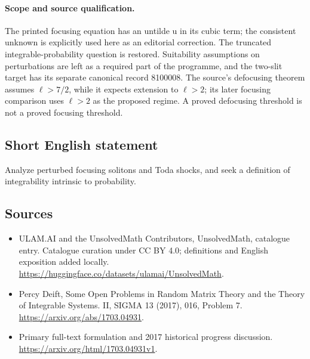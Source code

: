 \documentclass[11pt]{article}
\begin{document}
\paragraph{Scope and source qualification.}The printed focusing equation has an untilde u in its cubic term; the consistent unknown is explicitly used here as an editorial correction. The truncated integrable-probability question is restored. Suitability assumptions on perturbations are left as a required part of the programme, and the two-slit target has its separate canonical record 8100008. The source's defocusing theorem assumes $\ell>7/2$, while it expects extension to $\ell>2$; its later focusing comparison uses $\ell>2$ as the proposed regime. A proved defocusing threshold is not a proved focusing threshold.
\subsection{Short English statement}
Analyze perturbed focusing solitons and Toda shocks, and seek a definition of integrability intrinsic to probability.
\subsection{Sources}
\begin{itemize}
\item[\hypertarget{source:statement:1}{S1}] ULAM.AI and the UnsolvedMath Contributors, UnsolvedMath, catalogue entry. Catalogue curation under CC BY 4.0; definitions and English exposition added locally.
\url{https://huggingface.co/datasets/ulamai/UnsolvedMath}.
\item[\hypertarget{source:statement:2}{S2}] Percy Deift, Some Open Problems in Random Matrix Theory and the Theory of Integrable Systems. II, SIGMA 13 (2017), 016, Problem 7.
\url{https://arxiv.org/abs/1703.04931}.
\item[\hypertarget{source:statement:3}{S3}] Primary full-text formulation and 2017 historical progress discussion.
\url{https://arxiv.org/html/1703.04931v1}.
\end{itemize}
\label{end:statement}
\end{document}
